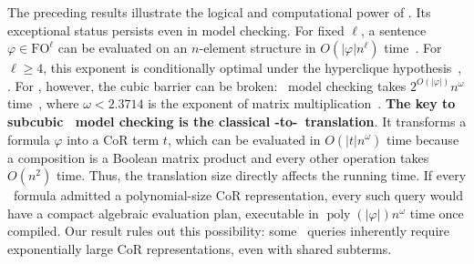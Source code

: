 \smallskip
{}
The preceding results illustrate the logical and computational power of \FOthree.
Its exceptional status persists even in model checking.
For fixed $\ell$, a sentence $\varphi \in \mathrm{FO}^{\ell}$ can be evaluated on an $n$-element structure in $O(|\varphi|n^\ell)$ time~\citep{vardi1995}.
For $\ell\ge4$, this exponent is conditionally optimal under the hyperclique hypothesis~\citep{bringmann-slusallek2021}, \citep[Corollary~32]{nakamura-uezato2027}.
For \FOthree, however, the cubic barrier can be broken: \FOthree\ model checking takes $2^{O(|\varphi|)}n^\omega$ time~\citep[Theorem~10]{nakamura-uezato2027}, where $\omega < 2.3714$ is the exponent of matrix multiplication~\citep{alman2025}.
%
\textbf{The key to subcubic \FOthree\ model checking is the classical \FOthree-to-\CoR\ translation}.
It transforms a formula $\varphi$ into a CoR term $t$, which can be evaluated in $O(|t|n^\omega)$ time because a composition is a Boolean matrix product and every other operation takes $O(n^2)$ time.
Thus, the translation size directly affects the running time.
If every \FOthree\ formula admitted a polynomial-size CoR representation, every such query would have a compact algebraic evaluation plan,
executable in $\operatorname{poly}(|\varphi|)n^\omega$ time once compiled.
Our result rules out this possibility: some \FOthree\ queries inherently require exponentially large CoR representations, even with shared subterms.




%







